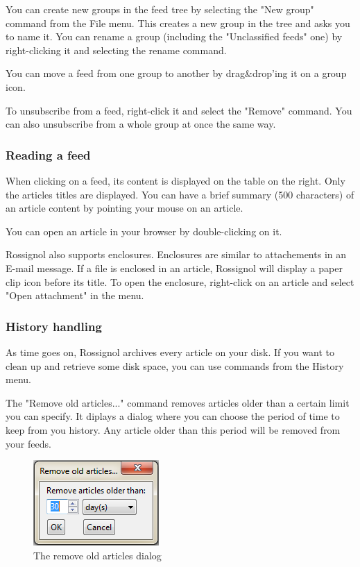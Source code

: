\documentclass[11pt]{article} %
\begin{document}
You can create new groups in the feed tree by selecting the "New group" command 
from the File menu. This creates a new group in the tree and asks you to name 
it. You can rename a group (including the "Unclassified feeds" one) by 
right-clicking it and selecting the rename command. 

You can move a feed from one group to another by drag\&drop'ing it on a group 
icon. 

To unsubscribe from a feed, right-click it and select the "Remove" command. You
can also unsubscribe from a whole group at once the same way. 

\subsubsection{Reading a feed}

When clicking on a feed, its content is displayed on the table on the right. 
Only the articles titles are displayed. You can have a brief summary (500 
characters) of an article content by pointing your mouse on an article.

You can open an article in your browser by double-clicking on it.

Rossignol also supports enclosures. Enclosures are similar to attachements in an 
E-mail message. If a file is enclosed in an article, Rossignol will display 
a paper clip icon before its title. To open the enclosure, right-click on 
an article and select "Open attachment" in the menu.

\subsubsection{History handling}

As time goes on, Rossignol archives every article on your disk. If you want to 
clean up and retrieve some disk space, you can use commands from the History 
menu.

The "Remove old articles..." command removes articles older than a certain limit 
you can specify. It diplays a dialog where you can choose the period of time 
to keep from you history. Any article older than this period will be removed 
from your feeds. 

\begin{figure}[h]
\centering
\includegraphics{img/remove_old_articles_dialog.png}
\caption{The remove old articles dialog}
\end{figure}
\end{document}
